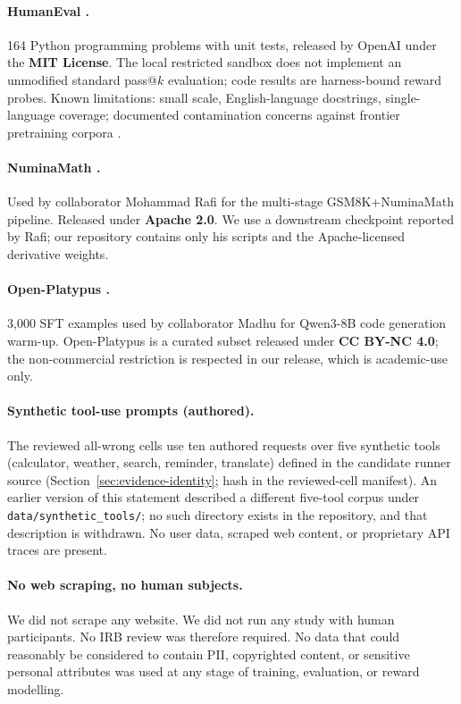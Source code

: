 \paragraph{HumanEval \cite{chen2021codex}.}
164 Python programming problems with unit tests, released by OpenAI under
the \textbf{MIT License}. The local restricted sandbox does not implement an unmodified standard
pass@$k$ evaluation; code results are harness-bound reward probes. Known
limitations: small scale, English-language docstrings, single-language
coverage; documented contamination concerns against frontier pretraining
corpora \cite{riddell2024contamination}.

\paragraph{NuminaMath \cite{li2024numinamath}.}
Used by collaborator Mohammad Rafi for the multi-stage
GSM8K+NuminaMath pipeline. Released under \textbf{Apache 2.0}. We use a
downstream checkpoint reported by Rafi; our repository contains only his
scripts and the Apache-licensed derivative weights.

\paragraph{Open-Platypus \cite{lee2023platypus}.}
3{,}000 SFT examples used by collaborator Madhu for Qwen3-8B code
generation warm-up. Open-Platypus is a curated subset released under
\textbf{CC BY-NC 4.0}; the non-commercial restriction is respected in our
release, which is academic-use only.

\paragraph{Synthetic tool-use prompts (authored).}
The reviewed all-wrong cells use ten authored requests over five synthetic tools
(calculator, weather, search, reminder, translate) defined in the candidate
runner source (Section~\ref{sec:evidence-identity}; hash in the reviewed-cell
manifest). An earlier version of this statement described a different five-tool
corpus under \texttt{data/synthetic\_tools/}; no such directory exists in the
repository, and that description is withdrawn. No user data, scraped web
content, or proprietary API traces are present.

\paragraph{No web scraping, no human subjects.}
We did not scrape any website. We did not run any study with human
participants. No IRB review was therefore required. No data that could
reasonably be considered to contain PII, copyrighted content, or sensitive
personal attributes was used at any stage of training, evaluation, or
reward modelling.

